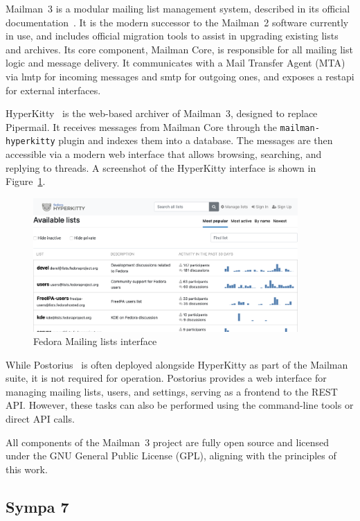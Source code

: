 Mailman~3 is a modular mailing list management system, described in its official documentation~\cite{mailman-install-docs}. It is the modern successor to the Mailman~2 software currently in use, and includes official migration tools to assist in upgrading existing lists and archives. Its core component, Mailman Core, is responsible for all mailing list logic and message delivery. It communicates with a Mail Transfer Agent (MTA) via \gls{lmtp} for incoming messages and \gls{smtp} for outgoing ones, and exposes a \gls{restapi} for external interfaces.

HyperKitty~\cite{hyperkitty-docs} is the web-based archiver of Mailman~3, designed to replace Pipermail. It receives messages from Mailman Core through the \texttt{mailman-hyperkitty} plugin and indexes them into a database. The messages are then accessible via a modern web interface that allows browsing, searching, and replying to threads. A screenshot of the HyperKitty interface is shown in Figure~\ref{fig:fedora-hyperkitty}.

\begin{figure}[H]
  \centering
  \includegraphics[width=0.9\textwidth]{imaxes/fedora-hyperkitty.png}
  \caption{Fedora Mailing lists interface}
  \label{fig:fedora-hyperkitty}
\end{figure}

While Postorius~\cite{postorius-docs} is often deployed alongside HyperKitty as part of the Mailman suite, it is not required for operation. Postorius provides a web interface for managing mailing lists, users, and settings, serving as a frontend to the REST API. However, these tasks can also be performed using the command-line tools or direct API calls.

All components of the Mailman~3 project are fully open source and licensed under the GNU General Public License (GPL), aligning with the principles of this work.

\subsection{Sympa 7}

